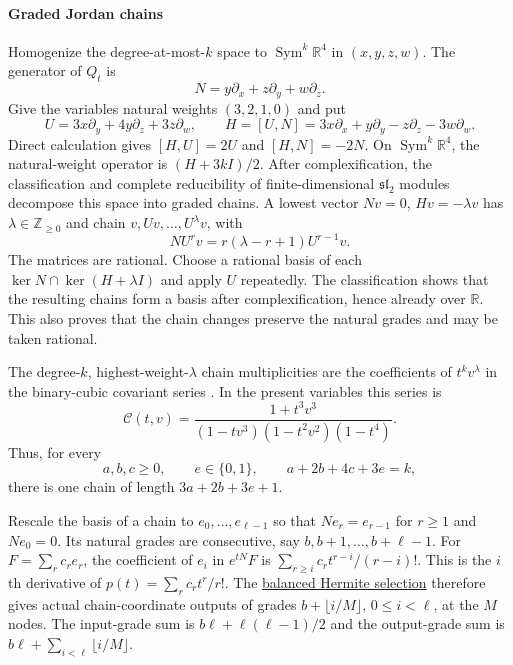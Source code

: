 \documentclass[11pt]{amsart}
\theoremstyle{definition}
\theoremstyle{remark}
\newcommand{\R}{\mathbb R}
\DeclareMathOperator{\Sym}{Sym}
\numberwithin{equation}{section}
\begin{document}
\paragraph{Graded Jordan chains}
Homogenize the degree-at-most-$k$ space to $\Sym^k\R^4$ in $(x,y,z,w)$. The generator of $Q_t$ is
\[
N=y\partial_x+z\partial_y+w\partial_z.
\]
Give the variables natural weights $(3,2,1,0)$ and put
\[
U=3x\partial_y+4y\partial_z+3z\partial_w,\qquad H=[U,N]=3x\partial_x+y\partial_y-z\partial_z-3w\partial_w.
\]
Direct calculation gives $[H,U]=2U$ and $[H,N]=-2N$. On $\operatorname{Sym}^k\mathbb R^4$, the natural-weight operator is $(H+3kI)/2$. After complexification, the classification and complete reducibility of finite-dimensional $\mathfrak{sl}_2$ modules \cite[Theorem 11.16]{EtingofSL2} decompose this space into graded chains. A lowest vector $Nv=0$, $Hv=-\lambda v$ has $\lambda\in\mathbb Z_{\ge0}$ and chain $v,Uv,\ldots,U^\lambda v$, with
\begin{equation}\label{reg:eq:sl2}
NU^rv=r(\lambda-r+1)U^{r-1}v.
\end{equation}
The matrices are rational. Choose a rational basis of each $\ker N\cap\ker(H+\lambda I)$ and apply $U$ repeatedly. The classification shows that the resulting chains form a basis after complexification, hence already over $\mathbb R$. This also proves that the chain changes preserve the natural grades and may be taken rational.

The degree-$k$, highest-weight-$\lambda$ chain multiplicities are the coefficients of $t^kv^\lambda$ in the binary-cubic covariant series \cite[Lemma~2.1 and p.~8]{BedratyukCovariants}. In the present variables this series is
\begin{equation}\label{reg:eq:chain-series}
 \mathcal C(t,v)=\frac{1+t^3v^3}{(1-tv^3)(1-t^2v^2)(1-t^4)}.
\end{equation}
Thus, for every
\begin{equation}\label{reg:eq:quadruples}
a,b,c\ge0,\qquad e\in\{0,1\},\qquad a+2b+4c+3e=k,
\end{equation}
there is one chain of length $3a+2b+3e+1$.

Rescale the basis of a chain to $e_0,\ldots,e_{\ell-1}$ so that $Ne_r=e_{r-1}$ for $r\ge1$ and $Ne_0=0$. Its natural grades are consecutive, say $b,b+1,\ldots,b+\ell-1$. For $F=\sum_rc_re_r$, the coefficient of $e_i$ in $e^{tN}F$ is $\sum_{r\ge i}c_rt^{r-i}/(r-i)!$. This is the $i$th derivative of $p(t)=\sum_rc_rt^r/r!$. The \hyperref[reg:balanced-hermite]{balanced Hermite selection} therefore gives actual chain-coordinate outputs of grades $b+\lfloor i/M\rfloor$, $0\le i<\ell$, at the $M$ nodes. The input-grade sum is $b\ell+\ell(\ell-1)/2$ and the output-grade sum is $b\ell+\sum_{i<\ell}\lfloor i/M\rfloor$.
\end{document}
